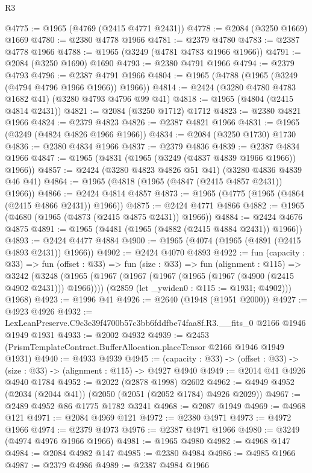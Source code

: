 \begin{lexlean}{R3}
\begin{coremodule}
@4775 := @1965 (@4769 (@2415 @4771 @2431))
@4778 := @2084 (@3250 @1669) @1669
@4780 := @2380 @4778 @1966
@4781 := @2379 @4780
@4783 := @2387 @4778 @1966
@4788 := @1965 (@3249 (@4781 @4783 @1966 @1966))
@4791 := @2084 (@3250 @1690) @1690
@4793 := @2380 @4791 @1966
@4794 := @2379 @4793
@4796 := @2387 @4791 @1966
@4804 := @1965 (@4788 (@1965 (@3249 (@4794 @4796 @1966 @1966)) @1966))
@4814 := @2424 (@3280 @4780 @4783 @1682 @41) (@3280 @4793 @4796 @99 @41)
@4818 := @1965 (@4804 (@2415 @4814 @2431))
@4821 := @2084 (@3250 @1712) @1712
@4823 := @2380 @4821 @1966
@4824 := @2379 @4823
@4826 := @2387 @4821 @1966
@4831 := @1965 (@3249 (@4824 @4826 @1966 @1966))
@4834 := @2084 (@3250 @1730) @1730
@4836 := @2380 @4834 @1966
@4837 := @2379 @4836
@4839 := @2387 @4834 @1966
@4847 := @1965 (@4831 (@1965 (@3249 (@4837 @4839 @1966 @1966)) @1966))
@4857 := @2424 (@3280 @4823 @4826 @51 @41) (@3280 @4836 @4839 @46 @41)
@4864 := @1965 (@4818 (@1965 (@4847 (@2415 @4857 @2431)) @1966))
@4866 := @2424 @4814 @4857
@4873 := @1965 (@4775 (@1965 (@4864 (@2415 @4866 @2431)) @1966))
@4875 := @2424 @4771 @4866
@4882 := @1965 (@4680 (@1965 (@4873 (@2415 @4875 @2431)) @1966))
@4884 := @2424 @4676 @4875
@4891 := @1965 (@4481 (@1965 (@4882 (@2415 @4884 @2431)) @1966))
@4893 := @2424 @4477 @4884
@4900 := @1965 (@4074 (@1965 (@4891 (@2415 @4893 @2431)) @1966))
@4902 := @2424 @4070 @4893
@4922 := fun (capacity : @33) =>
  fun (offset : @33) =>
  fun (size : @33) =>
  fun (alignment : @115) =>
  @3242
    (@3248
      (@1965
        (@1967 (@1967 (@1967 (@1965 (@1967 (@4900 (@2415 @4902 @2431))) @1966))))
        (@2859 (let _ywiden0 : @115 := @1931; @4902)))
      @1968)
@4923 := @1996 @41
@4926 := @2640 (@1948 (@1951 @2000))
@4927 := @4923 @4926
@4932 := LexLeanPreserve.C9c3e39f4700b57c3bb6fddfbe74faa8f.R3.__fits_0 @2166 @1946 @1949 @1931
@4933 := @2002 @4932
@4939 := @2453 (PrismTemplateContract.BufferAllocation.placeTensor @2166 @1946 @1949 @1931)
@4940 := @4933 @4939
@4945 := (capacity : @33) -> (offset : @33) -> (size : @33) -> (alignment : @115) -> @4927 @4940
@4949 := @2014 @41 @4926 @4940 @1784
@4952 := @2022 (@2878 @1998) @2602
@4962 := @4949 @4952 (@2034 (@2044 @41)) (@2050 (@2051 (@2052 @1784) @4926 @2029))
@4967 := @2489 @4952 @86 @1775 @1782 @3241
@4968 := @2087 @1949
@4969 := @4968 @121
@4971 := @2084 @4969 @121
@4972 := @2380 @4971
@4973 := @4972 @1966
@4974 := @2379 @4973
@4976 := @2387 @4971 @1966
@4980 := @3249 (@4974 @4976 @1966 @1966)
@4981 := @1965 @4980
@4982 := @4968 @147
@4984 := @2084 @4982 @147
@4985 := @2380 @4984
@4986 := @4985 @1966
@4987 := @2379 @4986
@4989 := @2387 @4984 @1966

\end{coremodule}
\end{lexlean}
